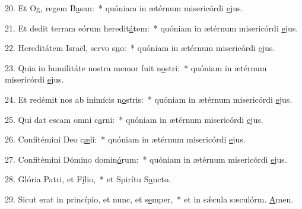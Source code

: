 20. Et Og, regem B\uline{a}san:~* quóniam in ætérnum misericórdi \uline{e}jus.\par 
21. Et dedit terram eórum heredit\uline{á}tem:~* quóniam in ætérnum misericórdi \uline{e}jus.\par 
22. Hereditátem Israël, servo s\uline{u}o:~* quóniam in ætérnum misericórdi \uline{e}jus.\par 
23. Quia in humilitáte nostra memor fuit n\uline{o}stri:~* quóniam in ætérnum misericórdi \uline{e}jus.\par 
24. Et redémit nos ab inimícis n\uline{o}stris:~* quóniam in ætérnum misericórdi \uline{e}jus.\par 
25. Qui dat escam omni c\uline{a}rni:~* quóniam in ætérnum misericórdi \uline{e}jus.\par 
26. Confitémini Deo c\uline{æ}li:~* quóniam in ætérnum misericórdi \uline{e}jus.\par 
27. Confitémini Dómino domin\uline{ó}rum:~* quóniam in ætérnum misericórdi \uline{e}jus.\par 
28. Glória Patri, et F\uline{í}lio,~* et Spirítu S\uline{a}ncto.\par 
29. Sicut erat in princípio, et nunc, et s\uline{e}mper,~* et in sǽcula sæculórm. \uline{A}men.\par 
